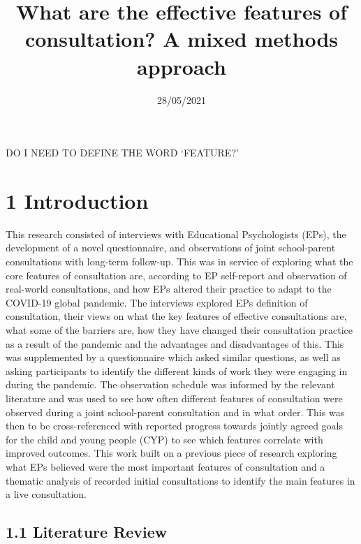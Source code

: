 \documentclass[
]{article}
\title{What are the effective features of consultation? A mixed methods
approach}
\author{}
\date{\vspace{-2.5em}28/05/2021}
\begin{document}
\maketitle

DO I NEED TO DEFINE THE WORD `FEATURE?'

\hypertarget{introduction}{%
\section{1 Introduction}\label{introduction}}

This research consisted of interviews with Educational Psychologists
(EPs), the development of a novel questionnaire, and observations of
joint school-parent consultations with long-term follow-up. This was in
service of exploring what the core features of consultation are,
according to EP self-report and observation of real-world consultations,
and how EPs altered their practice to adapt to the COVID-19 global
pandemic. The interviews explored EPs definition of consultation, their
views on what the key features of effective consultations are, what some
of the barriers are, how they have changed their consultation practice
as a result of the pandemic and the advantages and disadvantages of
this. This was supplemented by a questionnaire which asked similar
questions, as well as asking participants to identify the different
kinds of work they were engaging in during the pandemic. The observation
schedule was informed by the relevant literature and was used to see how
often different features of consultation were observed during a joint
school-parent consultation and in what order. This was then to be
cross-referenced with reported progress towards jointly agreed goals for
the child and young people (CYP) to see which features correlate with
improved outcomes. This work built on a previous piece of research
exploring what EPs believed were the most important features of
consultation and a thematic analysis of recorded initial consultations
to identify the main features in a live consultation.

\hypertarget{literature-review}{%
\subsection{1.1 Literature Review}\label{literature-review}}
\end{document}
